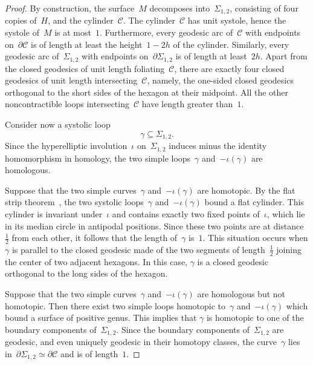 \documentclass[12pt,reqno]{amsart}
\theoremstyle{definition}
\numberwithin{equation}{section}
\numberwithin{equation}{section}
\begin{document}
\begin{proof}
By construction, the surface~$M$ decomposes into~$\Sigma_{1,2}$, consisting of four copies of~$H$, and the cylinder~$\mathcal{C}$.
The cylinder~$\mathcal{C}$ has unit systole, hence the systole of~$M$ is at most~$1$.
Furthermore, every geodesic arc of~$\mathcal{C}$ with endpoints on~$\partial \mathcal{C}$ is of length at least the height~$1-2h$ of the cylinder.
Similarly, every geodesic arc of~$\Sigma_{1,2}$ with endpoints on~$\partial \Sigma_{1,2}$ is of length at least~$2h$.
Apart from the closed geodesics of unit length foliating~$\mathcal{C}$, there are exactly four closed geodesics of unit length intersecting~$\mathcal{C}$, namely, the one-sided closed geodesics orthogonal to the short sides of the hexagon at their midpoint.
All the other noncontractible loops intersecting~$\mathcal{C}$ have length greater than~$1$.

Consider now a systolic loop
\[
\gamma\subseteq\Sigma_{1,2}.
\]
Since the hyperelliptic involution~$\iota$ on~$\Sigma_{1,2}$ induces minus the identity homomorphism in homology, the two simple loops~$\gamma$ and~$-\iota(\gamma)$ are homologous.

Suppose that the two simple curves~$\gamma$ and~$-\iota(\gamma)$ are homotopic.
By the flat strip theorem~\cite[\S II.2.13]{BH}, the two systolic loops~$\gamma$ and~$-\iota(\gamma)$ bound a flat cylinder.
This cylinder is invariant under~$\iota$ and contains exactly two fixed points of~$\iota$, which lie in its median circle in antipodal positions.
Since these two points are at distance~$\frac{1}{2}$ from each other, it follows that the length of~$\gamma$ is~$1$.
This situation occurs when $\gamma$ is parallel to the closed geodesic made of the two segments of length~$\frac{1}{2}$ joining the center of two adjacent hexagons.
In this case, $\gamma$ is a closed geodesic orthogonal to the long sides of the hexagon.

Suppose that the two simple curves~$\gamma$ and~$-\iota(\gamma)$ are homologous but not homotopic.
Then there exist two simple loops homotopic to~$\gamma$ and~$-\iota(\gamma)$ which bound a surface of positive genus.
This implies that $\gamma$ is homotopic to one of the boundary components of~$\Sigma_{1,2}$.
Since the boundary components of~$\Sigma_{1,2}$ are geodesic, and even uniquely geodesic in their homotopy classes, the curve~$\gamma$ lies in~$\partial \Sigma_{1,2} \simeq \partial \mathcal{C}$ and is of length~$1$. 
\end{proof}
\end{document}

